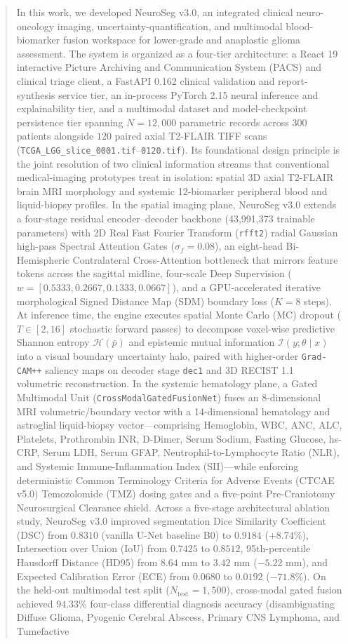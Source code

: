 \documentclass[conference]{IEEEtran}
\begin{document}
\begin{abstract}
In this work, we developed NeuroSeg v3.0, an integrated clinical neuro-oncology imaging, uncertainty-quantification, and multimodal blood-biomarker fusion workspace for lower-grade and anaplastic glioma assessment. The system is organized as a four-tier architecture: a React 19 interactive Picture Archiving and Communication System (PACS) and clinical triage client, a FastAPI 0.162 clinical validation and report-synthesis service tier, an in-process PyTorch 2.15 neural inference and explainability tier, and a multimodal dataset and model-checkpoint persistence tier spanning $N = 12,000$ parametric records across $300$ patients alongside $120$ paired axial T2-FLAIR TIFF scans (\texttt{TCGA\_LGG\_slice\_0001.tif}--\texttt{0120.tif}). Its foundational design principle is the joint resolution of two clinical information streams that conventional medical-imaging prototypes treat in isolation: spatial 3D axial T2-FLAIR brain MRI morphology and systemic 12-biomarker peripheral blood and liquid-biopsy profiles. In the spatial imaging plane, NeuroSeg v3.0 extends a four-stage residual encoder--decoder backbone (43,991,373 trainable parameters) with 2D Real Fast Fourier Transform (\texttt{rfft2}) radial Gaussian high-pass Spectral Attention Gates ($\sigma_f = 0.08$), an eight-head Bi-Hemispheric Contralateral Cross-Attention bottleneck that mirrors feature tokens across the sagittal midline, four-scale Deep Supervision ($w = [0.5333, 0.2667, 0.1333, 0.0667]$), and a GPU-accelerated iterative morphological Signed Distance Map (SDM) boundary loss ($K = 8$ steps). At inference time, the engine executes spatial Monte Carlo (MC) dropout ($T \in [2, 16]$ stochastic forward passes) to decompose voxel-wise predictive Shannon entropy $\mathcal{H}(\bar{p})$ and epistemic mutual information $\mathcal{I}(y;\theta \mid x)$ into a visual boundary uncertainty halo, paired with higher-order \texttt{Grad-CAM++} saliency maps on decoder stage \texttt{dec1} and 3D RECIST 1.1 volumetric reconstruction. In the systemic hematology plane, a Gated Multimodal Unit (\texttt{CrossModalGatedFusionNet}) fuses an 8-dimensional MRI volumetric/boundary vector with a 14-dimensional hematology and astroglial liquid-biopsy vector---comprising Hemoglobin, WBC, ANC, ALC, Platelets, Prothrombin INR, D-Dimer, Serum Sodium, Fasting Glucose, hs-CRP, Serum LDH, Serum GFAP, Neutrophil-to-Lymphocyte Ratio (NLR), and Systemic Immune-Inflammation Index (SII)---while enforcing deterministic Common Terminology Criteria for Adverse Events (CTCAE v5.0) Temozolomide (TMZ) dosing gates and a five-point Pre-Craniotomy Neurosurgical Clearance shield. Across a five-stage architectural ablation study, NeuroSeg v3.0 improved segmentation Dice Similarity Coefficient (DSC) from $0.8310$ (vanilla U-Net baseline B0) to $0.9184$ ($+8.74\%$), Intersection over Union (IoU) from $0.7425$ to $0.8512$, 95th-percentile Hausdorff Distance (HD95) from $8.64\text{ mm}$ to $3.42\text{ mm}$ ($-5.22\text{ mm}$), and Expected Calibration Error (ECE) from $0.0680$ to $0.0192$ ($-71.8\%$). On the held-out multimodal test split ($N_{\text{test}} = 1,500$), cross-modal gated fusion achieved $94.33\%$ four-class differential diagnosis accuracy (disambiguating Diffuse Glioma, Pyogenic Cerebral Abscess, Primary CNS Lymphoma, and Tumefactive 
\end{abstract}
\end{document}
